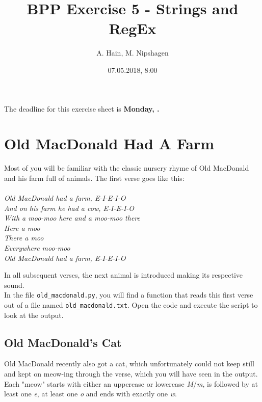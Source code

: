 


\title{BPP Exercise 5 - Strings and RegEx}
\author{A. Hain, M. Nipshagen}
\date{07.05.2018, 8:00}

\makeatletter
\let\thetitle\@title
\let\theauthor\@author
\let\thedate\@date
\makeatother

\newcommand\lpb{\small{<}}
\newcommand\rpb{\small{>}}
\newcommand\SubPoint[1]{
  \begin{itemize}
    \item #1
  \end{itemize}
  }





The deadline for this exercise sheet is \textbf{Monday, \thedate.}
%
%
\section{Old MacDonald Had A Farm}
Most of you will be familiar with the classic nursery rhyme of Old MacDonald and his farm full of animals. The first verse goes like this:\\\\
\textit{Old MacDonald had a farm, E-I-E-I-O\\
And on his farm he had a cow, E-I-E-I-O\\
With a moo-moo here and a moo-moo there\\
Here a moo\\
There a moo\\
Everywhere moo-moo\\
Old MacDonald had a farm, E-I-E-I-O\\
}

\noindent In all subsequent verses, the next animal is introduced making its respective sound.\\
In the file \texttt{old\_macdonald.py}, you will find a function that reads this first verse out of a file named \texttt{old\_macdonald.txt}. Open the code and execute the script to look at the output.

\subsection{Old MacDonald's Cat}
Old MacDonald recently also got a cat, which unfortunately could not keep still and kept on meow-ing through the verse, which you will have seen in the output.\\
Each "meow" starts with either an uppercase or lowercase \textit{M}/\textit{m}, is followed by at least one \textit{e}, at least one \textit{o} and ends with exactly one \textit{w}.\\

